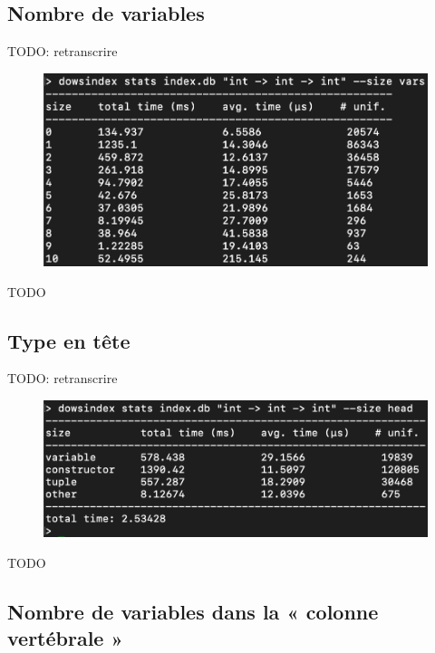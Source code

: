 \documentclass [a4paper] {report}
\theoremstyle {definition}
\begin{document}
\subsection {Nombre de variables}

TODO: retranscrire
\begin {figure} [h]
\begin {center}
	\includegraphics [scale=0.2] {images/stats1}
\end {center}
\end {figure}

TODO

\subsection {Type en tête}

TODO: retranscrire
\begin {figure} [h]
\begin {center}
	\includegraphics [scale=0.2] {images/stats2}
\end {center}
\end {figure}

TODO

\subsection {Nombre de variables dans la « colonne vertébrale »}
\end{document}
